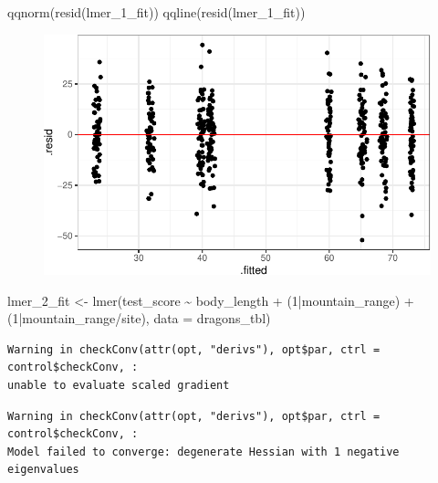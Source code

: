 \documentclass[
  letterpaper,
  DIV=11,
  oneside]{scrreport}
\newenvironment{Shaded}{\begin{snugshade}}{\end{snugshade}}
\newcommand{\AttributeTok}[1]{\textcolor[rgb]{0.40,0.45,0.13}{#1}}
\newcommand{\DecValTok}[1]{\textcolor[rgb]{0.68,0.00,0.00}{#1}}
\newcommand{\FunctionTok}[1]{\textcolor[rgb]{0.28,0.35,0.67}{#1}}
\newcommand{\NormalTok}[1]{\textcolor[rgb]{0.00,0.23,0.31}{#1}}
\newcommand{\OtherTok}[1]{\textcolor[rgb]{0.00,0.23,0.31}{#1}}
\newcommand{\SpecialCharTok}[1]{\textcolor[rgb]{0.37,0.37,0.37}{#1}}
\begin{document}
\begin{Shaded}
\begin{Highlighting}[]
\FunctionTok{qqnorm}\NormalTok{(}\FunctionTok{resid}\NormalTok{(lmer\_1\_fit))}
\FunctionTok{qqline}\NormalTok{(}\FunctionTok{resid}\NormalTok{(lmer\_1\_fit)) }
\end{Highlighting}
\end{Shaded}

\begin{figure}[H]

{\centering \includegraphics{./stat-modeling-mixed_files/figure-pdf/unnamed-chunk-15-1.pdf}

}

\end{figure}

\begin{Shaded}
\begin{Highlighting}[]
\NormalTok{lmer\_2\_fit }\OtherTok{\textless{}{-}} \FunctionTok{lmer}\NormalTok{(test\_score }\SpecialCharTok{\textasciitilde{}}\NormalTok{ body\_length }\SpecialCharTok{+}\NormalTok{ (}\DecValTok{1}\SpecialCharTok{|}\NormalTok{mountain\_range) }\SpecialCharTok{+}\NormalTok{ (}\DecValTok{1}\SpecialCharTok{|}\NormalTok{mountain\_range}\SpecialCharTok{/}\NormalTok{site), }\AttributeTok{data =}\NormalTok{ dragons\_tbl) }
\end{Highlighting}
\end{Shaded}

\begin{verbatim}
Warning in checkConv(attr(opt, "derivs"), opt$par, ctrl = control$checkConv, :
unable to evaluate scaled gradient
\end{verbatim}

\begin{verbatim}
Warning in checkConv(attr(opt, "derivs"), opt$par, ctrl = control$checkConv, :
Model failed to converge: degenerate Hessian with 1 negative eigenvalues
\end{verbatim}
\end{document}
